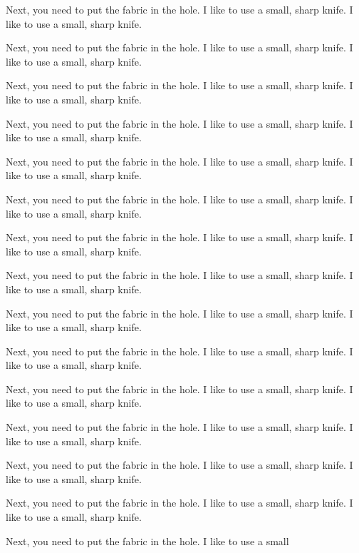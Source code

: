 \documentclass{article}
\theoremstyle{definition}
\begin{document}
\begin{displayquote}
{Next, you need to put the fabric in the hole. I like to use a small, sharp knife. I like to use a small, sharp knife.

Next, you need to put the fabric in the hole. I like to use a small, sharp knife. I like to use a small, sharp knife.

Next, you need to put the fabric in the hole. I like to use a small, sharp knife. I like to use a small, sharp knife.

Next, you need to put the fabric in the hole. I like to use a small, sharp knife. I like to use a small, sharp knife.

Next, you need to put the fabric in the hole. I like to use a small, sharp knife. I like to use a small, sharp knife.

Next, you need to put the fabric in the hole. I like to use a small, sharp knife. I like to use a small, sharp knife.

Next, you need to put the fabric in the hole. I like to use a small, sharp knife. I like to use a small, sharp knife.

Next, you need to put the fabric in the hole. I like to use a small, sharp knife. I like to use a small, sharp knife.

Next, you need to put the fabric in the hole. I like to use a small, sharp knife. I like to use a small, sharp knife.

Next, you need to put the fabric in the hole. I like to use a small, sharp knife. I like to use a small, sharp knife.

Next, you need to put the fabric in the hole. I like to use a small, sharp knife. I like to use a small, sharp knife.

Next, you need to put the fabric in the hole. I like to use a small, sharp knife. I like to use a small, sharp knife.

Next, you need to put the fabric in the hole. I like to use a small, sharp knife. I like to use a small, sharp knife.

Next, you need to put the fabric in the hole. I like to use a small, sharp knife. I like to use a small, sharp knife.

Next, you need to put the fabric in the hole. I like to use a small
}
\end{displayquote}
\end{document}
